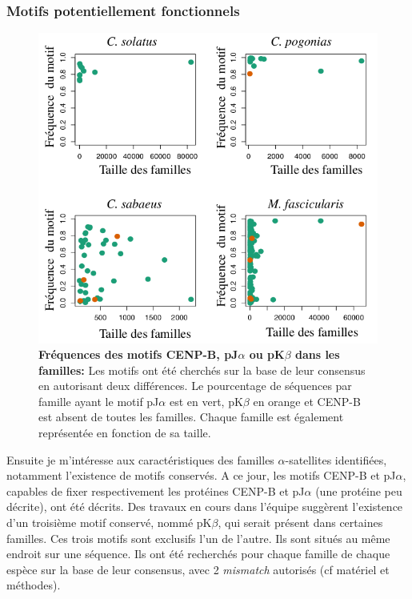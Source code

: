 \documentclass[12pt,a4paper]{article}
\begin{document}
			\subsubsection{Motifs potentiellement fonctionnels}
\begin{figure}
	\center	
	\includegraphics[scale=0.45]{img/graphique_motifs.png}
	\caption{\textbf{Fréquences des motifs CENP-B, pJ$\alpha$ ou pK$\beta$ dans les familles:} Les motifs ont été cherchés sur la base de leur consensus en autorisant deux différences. Le pourcentage de séquences par famille ayant le motif pJ$\alpha$ est en vert, pK$\beta$ en orange et CENP-B est absent de toutes les familles. Chaque famille est également représentée en fonction de sa taille.
	\label{fig:motif}} 
\end{figure}

			Ensuite je m'intéresse aux caractéristiques des familles $\alpha$-satellites identifiées, notamment l'existence de motifs conservés. A ce jour, les motifs CENP-B et pJ$\alpha$, capables de fixer respectivement les protéines CENP-B et pJ$\alpha$ (une protéine peu décrite), ont été décrits. Des travaux en cours dans l'équipe suggèrent l'existence d'un troisième motif conservé, nommé pK$\beta$, qui serait présent dans certaines familles. Ces trois motifs sont exclusifs l'un de l'autre. Ils sont situés au même endroit sur une séquence. Ils ont été recherchés pour chaque famille de chaque espèce sur la base de leur consensus, avec 2 \textit{mismatch} autorisés (cf matériel et méthodes).
			
\end{document}
